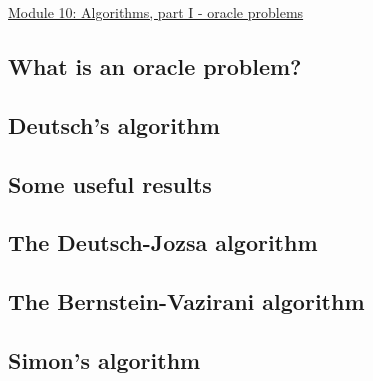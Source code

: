 \documentclass[main.tex]{subfiles}
\begin{document}
\href{https://www2.seas.gwu.edu/~simhaweb/quantum/modules/module10/module10.html}{Module 10: Algorithms, part I - oracle problems}

\subsection{What is an oracle problem?}

\subsection{Deutsch's algorithm}

\subsection{Some useful results}

\subsection{The Deutsch-Jozsa algorithm}

\subsection{The Bernstein-Vazirani algorithm}

\subsection{Simon's algorithm}
\end{document}
